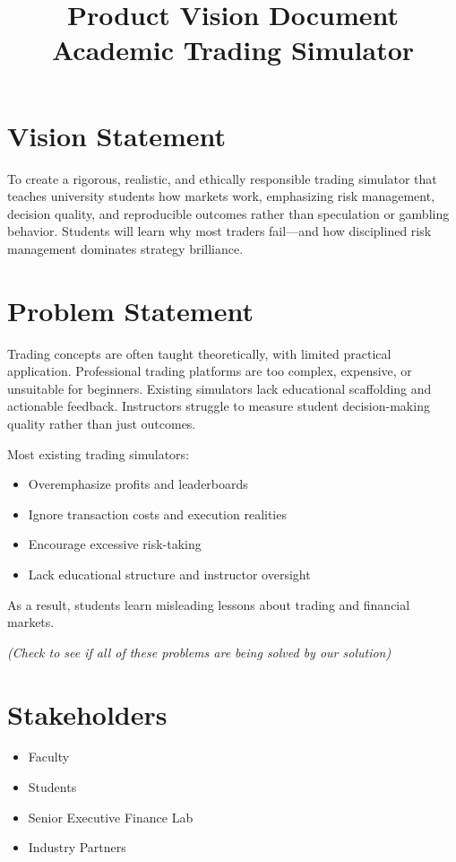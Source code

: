 \documentclass[12pt]{article}
\title{\textbf{Product Vision Document}\\Academic Trading Simulator}
\author{}
\date{}
\begin{document}
\maketitle

\section*{Vision Statement}
To create a rigorous, realistic, and ethically responsible trading simulator that teaches university students how markets work, emphasizing risk management, decision quality, and reproducible outcomes rather than speculation or gambling behavior. Students will learn why most traders fail—and how disciplined risk management dominates strategy brilliance.

\section*{Problem Statement}
Trading concepts are often taught theoretically, with limited practical application. Professional trading platforms are too complex, expensive, or unsuitable for beginners. Existing simulators lack educational scaffolding and actionable feedback. Instructors struggle to measure student decision-making quality rather than just outcomes.

Most existing trading simulators:
\begin{itemize}
    \item Overemphasize profits and leaderboards
    \item Ignore transaction costs and execution realities
    \item Encourage excessive risk-taking
    \item Lack educational structure and instructor oversight
\end{itemize}

As a result, students learn misleading lessons about trading and financial markets.

\textit{(Check to see if all of these problems are being solved by our solution)}
\newpage
\section*{Stakeholders}
\begin{itemize}
    \item Faculty
    \item Students
    \item Senior Executive Finance Lab
    \item Industry Partners
\end{itemize}
\end{document}
